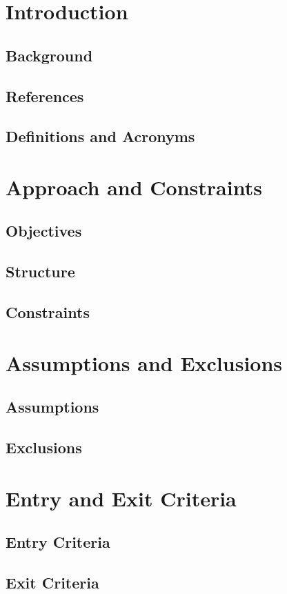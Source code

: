 \documentclass[12pt]{article}
\begin{document}
\section{Introduction}
\subsection{Background}
\subsection{References}
\subsection{Definitions and Acronyms}

\section{Approach and Constraints}
\subsection{Objectives}
\subsection{Structure}
\subsection{Constraints}

\section{Assumptions and Exclusions}
\subsection{Assumptions}
\subsection{Exclusions}

\section{Entry and Exit Criteria}
\subsection{Entry Criteria}
\subsection{Exit Criteria}
\end{document}
